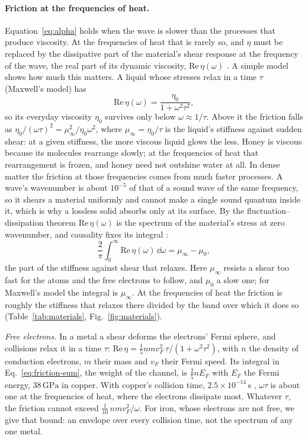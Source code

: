 \paragraph{Friction at the frequencies of heat.} Equation~\eqref{eq:alpha} holds when the wave
is slower than the processes that produce viscosity. At the frequencies of heat
that is rarely so, and $\eta$ must be replaced by the dissipative part of the
material's shear response at the frequency of the wave, the real part of its
dynamic viscosity, $\mathrm{Re}\,\eta(\omega)$ \cite{BaymPatilPethick2017}. A
simple model shows how much this matters. A liquid whose stresses relax in a
time $\tau$ (Maxwell's model) has
\begin{equation}\label{eq:maxwell}
\mathrm{Re}\,\eta(\omega) = \frac{\eta_0}{1 + \omega^2\tau^2} ,
\end{equation}
so its everyday viscosity $\eta_0$ survives only below $\omega \approx 1/\tau$.
Above it the friction falls as $\eta_0/(\omega\tau)^2 = \mu_\infty^2/\eta_0\omega^2$,
where $\mu_\infty = \eta_0/\tau$ is the liquid's stiffness against sudden shear:
at a given stiffness, the more viscous liquid glows the less. Honey is viscous
because its molecules rearrange slowly; at the frequencies of heat that
rearrangement is frozen, and honey need not outshine water at all. In dense matter the friction at those frequencies comes from much faster
processes. A wave's wavenumber is about $10^{-5}$ of that of a sound wave of the
same frequency, so it shears a material uniformly and cannot make a single
sound quantum inside it, which is why a lossless solid absorbs only at its
surface. By the
fluctuation--dissipation theorem $\mathrm{Re}\,\eta(\omega)$ is the spectrum of
the material's stress at zero wavenumber, and causality fixes its integral
\cite{SrivastavaWidomPizzella2003}:
\begin{equation}\label{eq:friction-sum}
\frac{2}{\pi}\int_0^\infty \mathrm{Re}\,\eta(\omega)\,\dd\omega = \mu_\infty - \mu_0 ,
\end{equation}
the part of the stiffness against shear that relaxes. Here $\mu_\infty$ resists a
shear too fast for the atoms and the free electrons to follow, and $\mu_0$ a slow
one; for Maxwell's model the integral is $\mu_\infty$. At the frequencies of heat
the friction is roughly the stiffness that relaxes there divided by the band
over which it does so (Table~\ref{tab:materials}, Fig.~\ref{fig:materials}).

\emph{Free electrons.} In a metal a shear deforms the electrons' Fermi sphere,
and collisions relax it in a time $\tau$:
$\mathrm{Re}\,\eta = \tfrac15 n m v_F^2\,\tau/(1 + \omega^2\tau^2)$, with $n$ the
density of conduction electrons, $m$ their mass and $v_F$ their Fermi speed. Its
integral in Eq.~\eqref{eq:friction-sum}, the weight of the channel, is
$\tfrac25 nE_F$ with $E_F$ the Fermi energy, $38\,\mathrm{GPa}$ in copper. With
copper's collision time, $2.5\times10^{-14}\,\mathrm{s}$ \cite{Hirayama2011},
$\omega\tau$ is about one at the frequencies of heat, where the electrons
dissipate most. Whatever $\tau$, the friction cannot exceed $\tfrac1{10}\,nmv_F^2/\omega$. For iron, whose
electrons are not free, we give that bound: an envelope over every collision
time, not the spectrum of any one metal.

